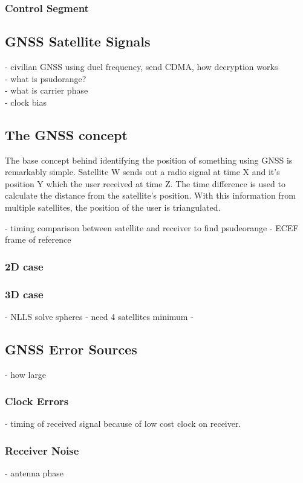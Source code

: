 \documentclass[11pt,a4paper]{article}
\begin{document}
\subsubsection{Control Segment}


\subsection{GNSS Satellite Signals}
- civilian GNSS using duel frequency, send CDMA, how decryption works\\
- what is psudorange?\\
- what is carrier phase\\
- clock bias\\






\subsection{The GNSS concept}
The base concept behind identifying the position of something using GNSS is remarkably simple. Satellite W sends out a radio signal at time X and it's position Y which the user received at time Z. The time difference is used to calculate the distance from the satellite's position. With this information from multiple satellites, the position of the user is triangulated. 


- timing comparison between satellite and receiver to find psudeorange
- ECEF frame of reference
\subsubsection{2D case}
\subsubsection{3D case}
- NLLS solve spheres
- need 4 satellites minimum
- 


\subsection{GNSS Error Sources}
- how large
\subsubsection{Clock Errors}
- timing of received signal because of low cost clock on receiver. 
\subsubsection{Receiver Noise}
- antenna phase
\end{document}
